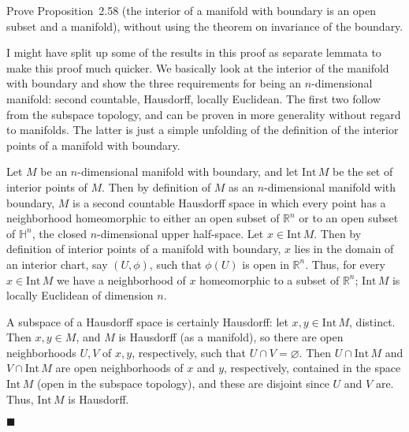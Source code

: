\documentclass[12pt]{article}
\renewcommand{\qed}{\hfill$\blacksquare$}
\renewenvironment{proof}{\begin{addmargin}[1em]{0em}\begin{newproof}}{\end{newproof}\end{addmargin}\qed}
\newenvironment{problem}[2][Problem]{\begin{trivlist}
\item[\hskip \labelsep {\bfseries #1}\hskip \labelsep {\bfseries #2.}]}{\end{trivlist}}
\begin{document}
\begin{problem}{2-25}
Prove Proposition~2.58 (the interior of a manifold with boundary is an open subset and a manifold), without using the theorem on invariance of the boundary.
\end{problem}
{\color{red} I might have split up some of the results in this proof as separate lemmata to make this proof much quicker. We basically look at the interior of the manifold with boundary and show the three requirements for being an $n$-dimensional manifold: second countable, Hausdorff, locally Euclidean. The first two follow from the subspace topology, and can be proven in more generality without regard to manifolds. The latter is just a simple unfolding of the definition of the interior points of a manifold with boundary.}\\
\begin{proof}
Let $M$ be an $n$-dimensional manifold with boundary, and let $\text{Int}\,M$ be the set of interior points of $M$. Then by definition of $M$ as an $n$-dimensional manifold with boundary, $M$ is a second countable Hausdorff space in which every point has a neighborhood homeomorphic to either an open subset of $\mathbb{R}^n$ or to an open subset of $\mathbb{H}^n$, the closed $n$-dimensional upper half-space. Let $x \in \text{Int}\,M$. Then by definition of interior points of a manifold with boundary, $x$ lies in the domain of an interior chart, say $\left(U,\phi\right)$, such that $\phi\left(U\right)$ is open in $\mathbb{R}^n$. Thus, for every $x\in \text{Int}\,M$ we have a neighborhood of $x$ homeomorphic to a subset of $\mathbb{R}^n$; $\text{Int}\,M$ is locally Euclidean of dimension $n$.

A subspace of a Hausdorff space is certainly Hausdorff: let $x,y \in \text{Int}\, M$, distinct. Then $x,y \in M$, and $M$ is Hausdorff (as a manifold), so there are open neighborhoods $U,V$ of $x,y$, respectively, such that $U \cap V = \varnothing$. Then $U\cap \text{Int}\, M$ and $V\cap \text{Int}\,M$ are open neighborhoods of $x$ and $y$, respectively, contained in the space $\text{Int}\,M$ (open in the subspace topology), and these are disjoint since $U$ and $V$ are. Thus, $\text{Int}\,M$ is Hausdorff.


\end{proof}
\end{document}
